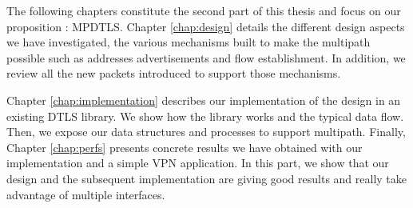 The following chapters constitute the second part of this thesis and focus on our proposition : MPDTLS. Chapter \ref{chap:design} details the different design aspects we have investigated, the various mechanisms built to make the multipath possible such as addresses advertisements and flow establishment. In addition, we review all the new packets introduced to support those mechanisms.

Chapter \ref{chap:implementation} describes our implementation of the design in an existing DTLS library. We show how the library works and the typical data flow. Then, we expose our data structures and processes to support multipath. Finally, Chapter \ref{chap:perfs} presents concrete results we have obtained with our implementation and a simple VPN application. In this part, we show that our design and the subsequent implementation are giving good results and really take advantage of multiple interfaces.

